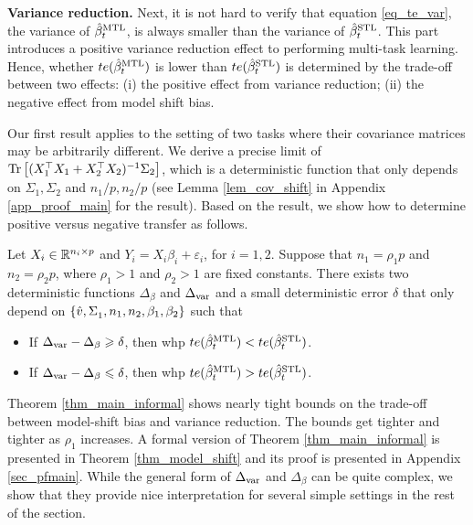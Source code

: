 \textbf{Variance reduction.}
Next, it is not hard to verify that equation \eqref{eq_te_var}, the variance of $\hat{\beta}_t^{\text{MTL}}$, is always smaller than the variance of $\hat{\beta}_t^{\text{STL}}$.
This part introduces a positive variance reduction effect to performing multi-task learning.
Hence, whether $te(\hat{\beta}_t^{\text{MTL}})$ is lower than $te(\hat{\beta}_t^{\text{STL}})$ is determined by the trade-off between two effects:
(i) the positive effect from variance reduction;
(ii) the negative effect from model shift bias.


Our first result applies to the setting of two tasks where their covariance matrices may be arbitrarily different.
We derive a precise limit of $\operatorname{Tr}\left[(X_1^{\top}X_1 + X_2^{\top}X_2)^{-1}\Sigma_2\right]$, which is a deterministic function that only depends on $\Sigma_1, \Sigma_2$ and $n_1/p, n_2/p$ (see Lemma \ref{lem_cov_shift} in Appendix \ref{app_proof_main} for the result).
Based on the result, we show how to determine positive versus negative transfer as follows.

\begin{theorem}[Informal]\label{thm_main_informal}
	Let $X_i \in\mathbb{R}^{n_i \times p}$ and $Y_i = X_i\beta_i + \varepsilon_i$, for $i = 1, 2$.
	Suppose that $n_1 = \rho_1 p$ and $n_2 = \rho_2 p$, where $\rho_1>1$ and $\rho_2 >1$ are fixed constants.
	There exists two deterministic functions $\Delta_{\beta}$ and $\Delta_{\text{var}}$ and a small deterministic error $\delta$ that only depend on $\{\hat{v}, \Sigma_1^{}, n_1, n_2, \beta_1, \beta_2\}$ such that
	\begin{itemize}
		\item If $\Delta_{\text{var}} - \Delta_{\beta} \geqslant \delta$, then whp $te(\hat{\beta}_t^{\text{MTL}}) < te(\hat{\beta}_t^{\text{STL}})$.
		\item If $\Delta_{\text{var}} - \Delta_{\beta} \leqslant \delta$, then whp $te(\hat{\beta}_t^{\text{MTL}}) > te(\hat{\beta}_t^{\text{STL}})$.
	\end{itemize}
\end{theorem}

Theorem \ref{thm_main_informal} shows nearly tight bounds on the trade-off between model-shift bias and variance reduction.
The bounds get tighter and tighter as $\rho_1$ increases.
A formal version of Theorem \ref{thm_main_informal} is presented in Theorem \ref{thm_model_shift} and its proof is presented in Appendix \ref{sec_pfmain}.
While the general form of $\Delta_{\text{var}}$ and $\Delta_{\beta}$ can be quite complex, we show that they provide nice interpretation for several simple settings in the rest of the section.


